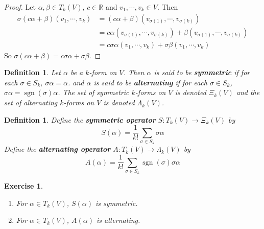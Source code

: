 \documentclass[12pt]{amsart}
\newtheorem{defn}[thm]{Definition}
\newtheorem{ex}[thm]{Exercise}
\newcommand{\al}{\alpha}
\newcommand{\Lam}{\Lambda}
\newcommand{\sig}{\sigma}
\newcommand{\R}{\mathbb{R}}
\DeclareMathOperator{\sgn}{sgn}
\begin{document}
	\begin{proof}
		Let $\al, \beta \in T_k(V)$, $c \in \R$ and $v_1, \cdots, v_k \in V$. Then 
		\begin{align*}
			\sig(c\al + \beta)(v_1, \cdots, v_k) 
			&= (c\al + \beta)(v_{\sig(1)}, \cdots, v_{\sig(k)}) \\
			&= c \al(v_{\sig(1)}, \cdots, v_{\sig(k)}) + \beta(v_{\sig(1)}, \cdots, v_{\sig(k)}) \\
			&= c \sig \al(v_1, \cdots, v_k) + \sig \beta(v_1, \cdots, v_k)
		\end{align*}
		So $\sig(c \al + \beta) = c\sig \al + \sig \beta$.
	\end{proof}
	
	\begin{defn}
		Let $\al$ be a $k$-form on $V$. Then $\al$ is said to be \textbf{symmetric} if for each $\sig \in S_k$, $\sig \al = \al$. and $\al$ is said to be \textbf{alternating} if for each $\sig \in S_k$, $\sig \al = \sgn(\sig) \al$.  The set of symmetric $k$-forms on $V$ is denoted $\Xi_k(V)$ and the set of alternating $k$-forms on $V$ is denoted $\Lam_k(V)$.
	\end{defn}

	\begin{defn}
		Define the \textbf{symmetric operator} $S: T_k(V) \rightarrow \Xi_k(V)$ by $$S(\al) = \frac{1}{k!}\sum_{\sig \in S_k} \sig \al$$  Define the \textbf{alternating operator} $A: T_k(V) \rightarrow \Lam_k(V)$ by $$A(\al) = \frac{1}{k!}\sum_{\sig \in S_k} \sgn(\sig)\sig \al$$
	\end{defn}
	
	\begin{ex}\
		\begin{enumerate}
			\item For $\al \in T_k(V)$, $S(\al)$ is symmetric.
			\item For $\al \in T_k(V)$, $A(\al)$ is alternating.
		\end{enumerate}
	\end{ex}
\end{document}
